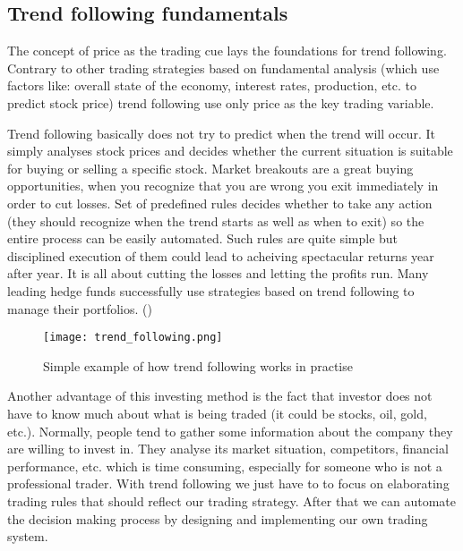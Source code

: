 \subsection{Trend following fundamentals}
\label{sec:trend_following_fundamentals}

The concept of price as the trading cue lays the foundations for trend following. 
Contrary to other trading strategies based on fundamental analysis (which use factors like: overall state of the economy, interest rates, production, etc. to predict stock price)
trend following use only price as the key trading variable. 

Trend following basically does not try to predict when the trend will occur. 
It simply analyses stock prices and decides whether the current situation is suitable for buying or selling a specific stock.
Market breakouts are a great buying opportunities, when you recognize that you are wrong you exit immediately in order to cut losses.
Set of predefined rules decides  whether to take any action (they should recognize when the trend starts as well as when to exit) so the entire process can be easily automated.
Such rules are quite simple but disciplined execution of them could lead to acheiving spectacular returns year after year.
It is all about cutting the losses and letting the profits run.
Many leading hedge funds successfully use strategies based on trend following to manage their portfolios. (\cite{Trend01})  

\clearpage
\begin{figure}[ht]
  \begin{center}
    \texttt{[image: trend\_following.png]}
  \end{center}
  \caption{Simple example of how trend following works in practise}
\end{figure}

Another advantage of this investing method is the fact that investor does not have to know much about what is being traded (it could be stocks, oil, gold, etc.).
Normally, people tend to gather some information about the company they are willing to invest in. 
They analyse its market situation, competitors, financial performance, etc. which is time consuming, especially for someone who is not a professional trader.
With trend following we just have to to focus on elaborating trading rules that should reflect our trading strategy.
After that we can automate the decision making process by designing and implementing our own trading system.   


